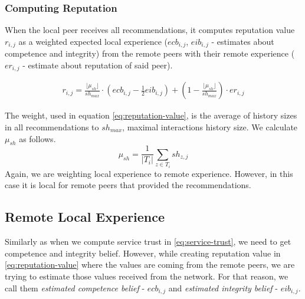 
\subsubsection{Computing Reputation}
\label{subsubsec:computing-reputation}
When the local peer receives all recommendations, it computes reputation value $r_{i,j}$ as a weighted expected local experience ($ecb_{i,j}$, $eib_{i,j}$ - estimates about competence and integrity) from the remote peers with their remote experience ($er_{i,j}$ - estimate about reputation of said peer).

\begin{equation}
\label{eq:reputation-value}
\begin{split}
    r_{i, j}=\frac{\lfloor\mu_{sh}\rfloor}{sh_{max}} \cdot \left(ecb_{i,j}-\frac{1}{2} eib_{i, j}\right) + \left(1-\frac{\lfloor\mu_{sh}\rfloor}{sh_{max}}\right) \cdot er_{i,j}
\end{split}
\end{equation}

\noindent
The weight, used in equation \ref{eq:reputation-value}, is the average of history sizes in all recommendations to $sh_{max}$, maximal interactions history size. 
We calculate $\mu_{sh}$ as follows.
\begin{equation}
    \mu_{sh} = \frac{1}{|T_{i}|} \sum_{z \in T_{i}} sh_{z, j}
\end{equation}
\noindent
Again, we are weighting local experience to remote experience. However, in this case it is local for remote peers that provided the recommendations.

\subsection{Remote Local Experience}
\label{subsec:remote-local-experience}
Similarly as when we compute service trust in \ref{eq:service-trust}, we need to get competence and integrity belief.
However, while creating reputation value in \ref{eq:reputation-value} where the values are coming from the remote peers, we are trying to estimate those values received from the network.
For that reason, we call them \textit{estimated competence belief} - $ecb_{i,j}$ and \textit{estimated integrity belief} - $eib_{i,j}$.

